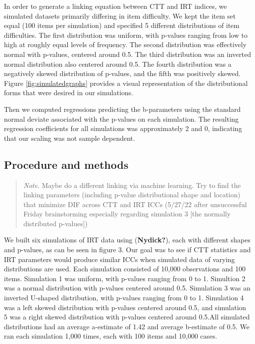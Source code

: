 \documentclass[
  man]{apa6}
\begin{document}
In order to generate a linking equation between CTT and IRT indices, we simulated datasets primarily differing in item difficulty. We kept the item set equal (100 items per simulation) and specified 5 different distributions of item difficulties. The first distribution was uniform, with p-values ranging from low to high at roughly equal levels of frequency. The second distribution was effectively normal with p-values, centered around 0.5. The third distribution was an inverted normal distribution also centered around 0.5. The fourth distribution was a negatively skewed distribution of p-values, and the fifth was positively skewed. Figure \ref{fig:simulatedgraphs} provides a visual representation of the distributional forms that were desired in our simulations.

Then we computed regressions predicting the b-parameters using the standard normal deviate associated with the p-values on each simulation. The resulting regression coefficients for all simulations was approximately 2 and 0, indicating that our scaling was not sample dependent.

\hypertarget{procedure-and-methods}{%
\subsection{Procedure and methods}\label{procedure-and-methods}}

\begin{quote}
\emph{Note}. Maybe do a different linking via machine learning. Try to find the linking parameters (including p-value distributional shape and location) that minimize DIF across CTT and IRT ICCs (5/27/22 after unsuccessful Friday brainstorming especially regarding simulation 3 {[}the normally distributed p-values{]})
\end{quote}

We built six simulations of IRT data using (\textbf{Nydick?}), each with different shapes and p-values, as can be seen in figure 3. Our goal was to see if CTT statistics and IRT parameters would produce similar ICCs when simulated data of varying distributions are used. Each simulation consisted of 10,000 observations and 100 items. Simulation 1 was uniform, with p-values ranging from 0 to 1. Simultion 2 was a normal distribution with p-values centered around 0.5. Simulation 3 was an inverted U-shaped distribution, with p-values ranging from 0 to 1. Simulation 4 was a left skewed distribution with p-values centered around 0.5, and simulation 5 was a right skewed distribution with p-values centered around 0.5.All simulated distributions had an average a-estimate of 1.42 and average b-estimate of 0.5. We ran each simulation 1,000 times, each with 100 items and 10,000 cases.
\end{document}
